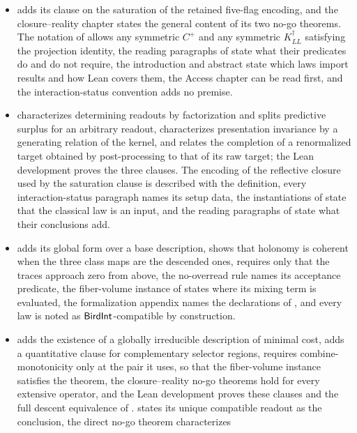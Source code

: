 \begin{itemize}
\item {} adds its clause on the saturation of the retained five-flag encoding,
  and the closure--reality chapter states the general content of its two no-go
  theorems. The notation of  allows any symmetric \(C^{+}\) and any
  symmetric \(K_{LL}^{\dagger}\) satisfying the projection identity, the reading
  paragraphs of  state what their predicates do
  and do not require, the introduction and abstract state which laws import
  results and how Lean covers them, the Access chapter can be read first, and
  the interaction-status convention adds no premise.
\item {} characterizes determining readouts by factorization
  and splits predictive surplus for an arbitrary readout, 
  characterizes presentation invariance by a generating relation of the
  kernel, and  relates the completion of a renormalized target
  obtained by post-processing to that of its raw target; the Lean development
  proves the three clauses. The encoding of the reflective closure used by the
  saturation clause is described with the definition, every
  interaction-status paragraph names its setup data, the instantiations of
   state that the classical law is an input, and the reading
  paragraphs of  state what their conclusions add.
\item {} adds its global form over a base description,
   shows that holonomy is coherent when the three class maps are
  the descended ones,  requires only that the traces approach
  zero from above, the no-overread rule names its acceptance predicate, the
  fiber-volume instance of  states where its mixing term is
  evaluated, the formalization appendix names the declarations of
  , and every law is noted as \(\mathsf{BirdInt}\)-compatible by
  construction.
\item {} adds the existence of a globally irreducible description
  of minimal cost,  adds a quantitative clause for
  complementary selector regions,  requires combine-monotonicity
  only at the pair it uses, so that the fiber-volume instance satisfies the
  theorem, the closure--reality no-go theorems hold for every extensive
  operator, and the Lean development proves these clauses and the full
  descent equivalence of .  states its unique
  compatible readout as the conclusion, the direct no-go theorem characterizes

\end{itemize}

